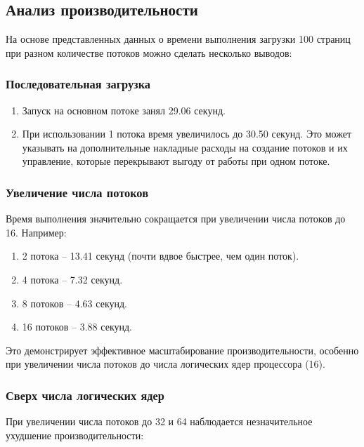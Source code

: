 \subsection*{Анализ производительности}

На основе представленных данных о времени выполнения загрузки 100 страниц при разном количестве потоков можно сделать несколько выводов:

\subsubsection*{Последовательная загрузка}

\begin{enumerate}
    \item Запуск на основном потоке занял 29.06 секунд.
    \item При использовании 1 потока время увеличилось до 30.50 секунд. Это может указывать на дополнительные накладные расходы на создание потоков и их управление, которые перекрывают выгоду от работы при одном потоке.
\end{enumerate}

\subsubsection*{Увеличение числа потоков}

Время выполнения значительно сокращается при увеличении числа потоков до 16. Например:

\begin{enumerate}
    \item 2 потока – 13.41 секунд (почти вдвое быстрее, чем один поток).
    \item 4 потока – 7.32 секунд.
    \item 8 потоков – 4.63 секунд.
    \item 16 потоков – 3.88 секунд.
\end{enumerate}

Это демонстрирует эффективное масштабирование производительности, особенно при увеличении числа потоков до числа логических ядер процессора (16).

\subsubsection*{Сверх числа логических ядер}

При увеличении числа потоков до 32 и 64 наблюдается незначительное ухудшение производительности:

